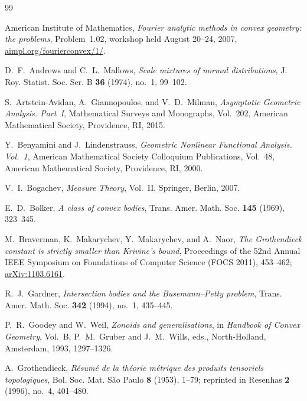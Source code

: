 \documentclass[11pt]{article}
\theoremstyle{definition}
\theoremstyle{remark}
\begin{document}
\begin{thebibliography}{99}
\footnotesize\raggedright
\setlength{\itemsep}{0pt}
\setlength{\parsep}{0pt}

American Institute of Mathematics,
\textit{Fourier analytic methods in convex geometry: the problems},
Problem~1.02, workshop held August 20--24, 2007,
\href{http://aimpl.org/fourierconvex/1/}{aimpl.org/fourierconvex/1/}.

D.~F.~Andrews and C.~L.~Mallows,
\textit{Scale mixtures of normal distributions},
J. Roy. Statist. Soc. Ser. B \textbf{36} (1974), no.~1, 99--102.

S.~Artstein-Avidan, A.~Giannopoulos, and V.~D.~Milman,
\textit{Asymptotic Geometric Analysis. Part~I},
Mathematical Surveys and Monographs, Vol.~202,
American Mathematical Society, Providence, RI, 2015.

Y.~Benyamini and J.~Lindenstrauss,
\textit{Geometric Nonlinear Functional Analysis. Vol.~1},
American Mathematical Society Colloquium Publications, Vol.~48,
American Mathematical Society, Providence, RI, 2000.

V.~I.~Bogachev,
\textit{Measure Theory}, Vol.~II,
Springer, Berlin, 2007.

E.~D.~Bolker,
\textit{A class of convex bodies},
Trans. Amer. Math. Soc. \textbf{145} (1969), 323--345.

M.~Braverman, K.~Makarychev, Y.~Makarychev, and A.~Naor,
\textit{The Grothendieck constant is strictly smaller than Krivine's
bound},
Proceedings of the 52nd Annual IEEE Symposium on Foundations of
Computer Science (FOCS 2011), 453--462;
\href{https://arxiv.org/abs/1103.6161}{arXiv:1103.6161}.

R.~J.~Gardner,
\textit{Intersection bodies and the Busemann--Petty problem},
Trans. Amer. Math. Soc. \textbf{342} (1994), no.~1, 435--445.




P.~R.~Goodey and W.~Weil,
\textit{Zonoids and generalisations},
in \textit{Handbook of Convex Geometry}, Vol.~B,
P.~M.~Gruber and J.~M.~Wills, eds., North-Holland, Amsterdam, 1993,
1297--1326.

A.~Grothendieck,
\textit{R\'esum\'e de la th\'eorie m\'etrique des produits tensoriels
topologiques},
Bol. Soc. Mat. S\~ao Paulo \textbf{8} (1953), 1--79;
reprinted in Resenhas \textbf{2} (1996), no.~4, 401--480.


\end{thebibliography}
\end{document}
